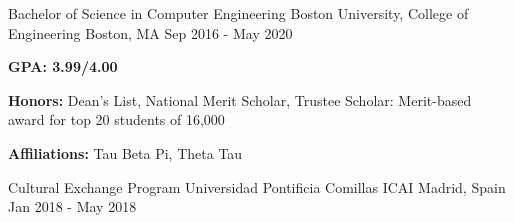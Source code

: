 



\begin{cventries}


\cventry
{Bachelor of Science in Computer Engineering} %
{Boston University, College of Engineering} %
{Boston, MA} %
{Sep 2016 - May 2020} %
{ %
\begin{cvitems}
\item {\textcolor{dark-grey}{\textbf{GPA: 3.99/4.00}}}
\item {\textcolor{dark-grey}{\textbf{Honors:}} Dean’s List, National Merit Scholar, Trustee Scholar: Merit-based award for top 20 students of 16,000}
\item {\textcolor{dark-grey}{\textbf{Affiliations:}} Tau Beta Pi, Theta Tau}
\end{cvitems}
}

\cventry
{Cultural Exchange Program} %
{Universidad Pontificia Comillas ICAI} %
{Madrid, Spain} %
{Jan 2018 - May 2018} %
{ %
}


\end{cventries}